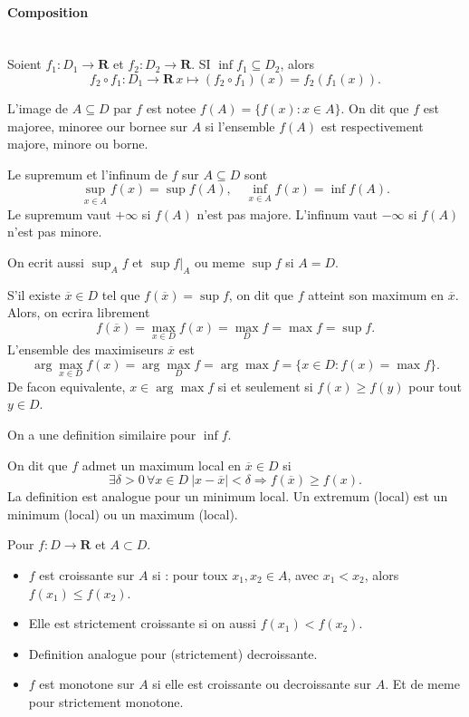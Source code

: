 \paragraph{Composition}~\\
Soient $f_{1}:D_{1}\to \mathbf{R}$ et $f_{2}:D_{2}\to \mathbf{R}$. SI $\inf f_{1}\subseteq D_{2}$, alors
$$
f_{2}\circ f_{1}:D_{1}\to \mathbf{R}\, x\mapsto(f_{2}\circ f_{1})(x)=f_{2}(f_{1}(x)).
$$

\begin{definition}
L'image de $A\subseteq D$ par $f$ est notee $f(A)=\{ f(x):x \in A \}$. On dit que $f$ est majoree, minoree our bornee sur $A$ si l'ensemble $f(A)$ est respectivement majore, minore ou borne.
\end{definition}
\begin{definition}
Le supremum et l'infinum de $f$ sur $A\subseteq D$ sont
$$
\sup _{x \in A}f(x)=\sup f(A),\quad \inf_{x \in A}f(x)=\inf f(A).
$$
Le supremum vaut $+\infty$ si $f(A)$ n'est pas majore. L'infinum vaut $-\infty$ si $f(A)$ n'est pas minore.
\end{definition}
\begin{notation}
On ecrit aussi $\sup_{A}f$ et $\sup f|_{A}$ ou meme $\sup f$ si $A=D$.
\end{notation}
\begin{definition}
S'il existe $\overline{x}\in D$ tel que $f(\overline{x})=\sup f$, on dit que $f$ atteint son maximum en $\overline{x}$. Alors, on ecrira librement 
$$
f(\overline{x})=\max_{x \in D}f(x)=\max_{D}f=\max f=\sup f.
$$
L'ensemble des maximiseurs $\overline{x}$ est
$$
\arg\max_{x \in D}f(x)=\arg\max_{D}f=\arg\max f=\{ x \in D:f(x)=\max f \}.
$$
De facon equivalente, $x \in\arg\max f$ si et seulement si $f(x)\ge f(y)$ pour tout $y\in D$.

On a une definition similaire pour $\inf f$.
\end{definition}
\begin{definition}
On dit que $f$ admet un maximum local en $\overline{x}\in D$ si 
$$
\exists\delta>0\,\forall x \in D\:|x-\overline{x}|<\delta \Rightarrow f(\overline{x})\ge f(x).
$$
La definition est analogue pour un minimum local. Un extremum (local) est un minimum (local) ou un maximum (local).
\end{definition}
\begin{definition}
Pour $f:D\to \mathbf{R}$ et $A\subset D$.
\begin{itemize}
\item $f$ est croissante sur $A$ si : pour toux $x_{1},x_{2}\in A$, avec $x_{1}<x_{2}$, alors $f(x_{1})\le f(x_{2})$.
\item Elle est strictement croissante si on aussi $f(x_{1})<f(x_{2})$.
\item Definition analogue pour (strictement) decroissante.
\item $f$ est monotone sur $A$ si elle est croissante ou decroissante sur $A$. Et de meme pour strictement monotone.
\end{itemize}
\end{definition}

